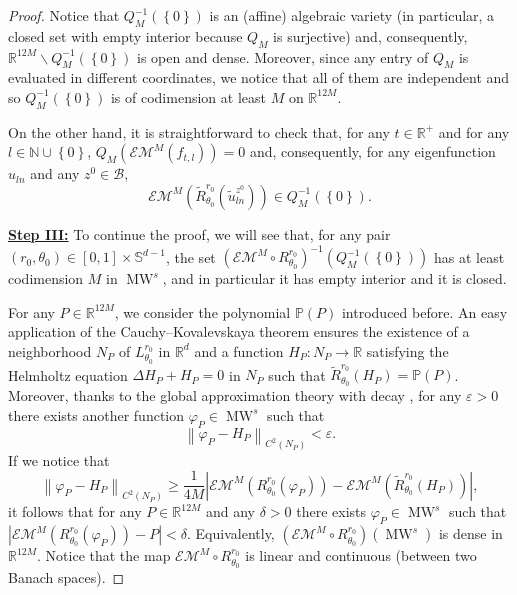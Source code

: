 \documentclass{amsart}
\theoremstyle{definition}
\theoremstyle{remark}
\newcommand{\de}{\delta}
\newcommand{\ep}{\varepsilon}
\def\RR{\mathbb{R}}
\renewcommand\leq\leqslant
\renewcommand\geq\geqslant
\numberwithin{equation}{section}
\theoremstyle{definition}
\theoremstyle{remark}
\def\RR{\mathbb{R}}
\DeclareMathOperator\MW{MW}
\begin{document}
\begin{proof}
      Notice that $Q_M^{-1}\left(\left\{0\right\}\right)$ is an (affine) algebraic variety (in particular, a closed set with empty interior because $Q_M$ is surjective) and, consequently, $\mathbb{R}^{12M}\backslash Q_M^{-1}\left(\left\{0\right\}\right)$ is open and dense.  Moreover, since any entry of $Q_M$ is evaluated in different coordinates, we notice that all of them are independent and so $Q_M^{-1}\left(\left\{0\right\}\right)$ is of codimension at least $M$ on $\mathbb{R}^{12M}$. 

       On the other hand, it is straightforward to check that, for any $t\in\mathbb{R}^+$ and for any $l\in\mathbb{N}\cup\left\{0\right\}$, $Q_M\left(\mathcal{EM}^M\left(f_{t,l}\right)\right)=0$ and, consequently, for any eigenfunction $u_{ln}$ and any $z^0\in\mathcal{B}$,
	\begin{equation}
		\mathcal{EM}^M\left(\tilde{R}_{\theta_0}^{r_0}\left(\tilde{u}_{ln}^{z^0}\right)\right)\in Q_M^{-1}\left(\left\{0\right\}\right).
	\end{equation}
	
  \textbf{	\underline{Step III:}} To continue the proof, we will see that, for any pair $\left(r_0,\theta_0\right)\in[0,1]\times\mathbb{S}^{d-1}$, the set $\left(\mathcal{EM}^M\circ	R_{\theta_0}^{r_0}\right)^{-1}\left( Q_M^{-1}\left(\left\{0\right\}\right)\right)$ has at least codimension $M$ in $\MW^s$, and in particular it has empty interior and it is closed.
  
  For any $P\in \RR^{12M}$, we consider the polynomial $\mathbb{P}(P)$ introduced before. An easy application of the Cauchy–Kovalevskaya theorem ensures the existence of a neighborhood $N_P$ of $L_{\theta_0}^{r_0}$ in $\mathbb{R}^{d}$ and a function $H_P:N_P\rightarrow\mathbb{R}$ satisfying the Helmholtz equation $\Delta H_P+H_P=0$ in $N_P$ such that $ \tilde{R}_{\theta_0}^{r_0}\left(H_P\right)=\mathbb{P}(P)$. Moreover, thanks to the global approximation theory with decay \cite{APDE}, for any $\ep>0$ there exists another function $\varphi_P\in\MW^s$ such that \begin{equation}
		\left\|\varphi_P-H_P\right\|_{C^2\left(N_P\right)}<\ep.
	\end{equation}If we notice that
	\begin{equation}
		\left\|\varphi_P-H_P\right\|_{C^2\left(N_P\right)}\geq\frac{1}{4M} \left|\mathcal{EM}^M\left( R_{\theta_0}^{r_0}\left(\varphi_P\right)\right)-\mathcal{EM}^M\left(\tilde{ R}_{\theta_0}^{r_0}\left(H_P\right)\right)\right|,
	\end{equation}it follows that for any $P\in\RR^{12M}$ and any $\de>0$ there exists $\varphi_P\in \MW^s$ such that $\left|\mathcal{EM}^M\left( R_{\theta_0}^{r_0}\left(\varphi_P\right)\right)-P\right|<\de.$ Equivalently, $\left(\mathcal{EM}^M\circ R_{\theta_0}^{r_0}\right)\left(\MW^s\right)$ is dense in $\RR^{12M}$.  Notice that the map $\mathcal{EM}^M\circ R_{\theta_0}^{r_0}$ is linear and continuous (between two Banach spaces). 
    

\end{proof}
\end{document}

